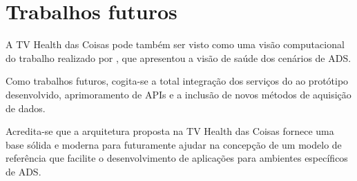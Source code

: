 \section{Trabalhos futuros} \label{sec:trabalhos-futuros}

A TV Health das Coisas pode também ser visto como uma visão computacional do
trabalho realizado por \citeauthor{paz2014}, que apresentou a visão de saúde
dos cenários de ADS. 

Como trabalhos futuros, cogita-se a total integração dos serviços do \nextsaude
ao protótipo desenvolvido, aprimoramento de APIs e a inclusão de novos métodos de 
aquisição de dados.

Acredita-se que a arquitetura proposta na TV Health
das Coisas fornece uma base sólida e moderna para futuramente ajudar na 
concepção de um modelo de referência que facilite o desenvolvimento de aplicações
para ambientes específicos de ADS. 




